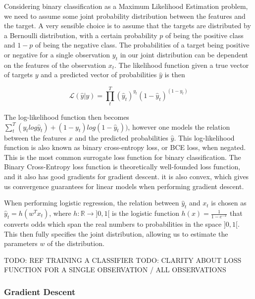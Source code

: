 Considering binary classification as a Maximum Likelihood Estimation problem,
we need to assume some joint probability distribution between the features and
the target. A very sensible choice is to assume that the targets are
distributed by a Bernoulli distribution, with a certain probability $p$ of
being the positive class and $1-p$ of being the negative class. The
probabilities of a target being positive or negative for a single observation
$y_t$ in our joint distribution can be dependent on the features of the
observation $x_t$. The likelihood function given a true vector of targets $y$
and a predicted vector of probabilities $\hat y$ is then

\begin{equation}
  \mathcal L(\hat y | y) = \prod_{t}^{T} (\hat y_t)^{y_t} (1-\hat y_t) ^(1-y_t)
\end{equation}

The log-likelihood function then becomes $\sum_t^T (y_t log \hat y_t) + (1-y_t)
log(1-\hat y_t))$, however one models the relation between the features $x$ and
the predicted probabilities $\hat y$. This log-likelihood function is also
known as binary cross-entropy loss, or BCE loss, when negated. This is the most
common surrogate loss function for binary classification. The Binary
Cross-Entropy loss function is theoretically well-founded loss function,
and it also has good gradients for gradient descent. it is also convex, which
gives us convergence guarantees for linear models when performing gradient
descent.

When performing logistic regression, the relation between $\hat y_t$ and $x_t$
is chosen as $\hat y_t = h(w^T x_t)$, where $h : \mathbb R \rightarrow ]0,1[$
is the logistic function $h(x)=\frac{1}{1-e^{-x}}$ that converts odds which
span the real numbers to probabilities in the space $]0,1[$. This then fully
specifies the joint distribution, allowing us to estimate the parameters $w$ of
the distribution.


TODO: REF TRAINING A CLASSIFIER
TODO: CLARITY ABOUT LOSS FUNCTION FOR A SINGLE OBSERVATION / ALL OBSERVATIONS

\subsubsection{Gradient Descent}


